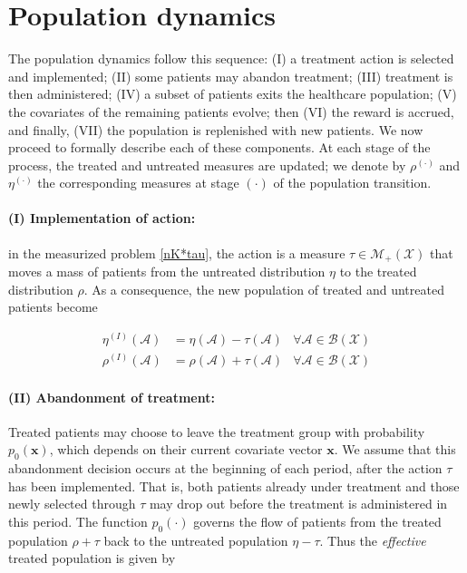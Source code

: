 \documentclass[12pt,a4paper]{article}
\newcommand{\blue}[1]{{\color{blue}{#1}}}
\newcommand{\bx}{\mathbf{x}}
\newcommand{\mA}{\mathcal{A}}
\newcommand{\mBX}{ \mathcal{B}(\mathcal{X})}
\newcommand{\mMplusX}{\mathcal{M}_{+}(\mathcal{X})}
\begin{document}
	
	
	
	
	\section{Population dynamics\label{Healthcare_process}}
    
The population dynamics follow this sequence: (I) a treatment action is selected and implemented; (II) some patients may abandon treatment; (III) treatment is then administered; (IV) a subset of patients exits the healthcare population; (V) the covariates of the remaining patients evolve; then (VI) the reward is accrued, and finally, (VII) the population is replenished with new patients. We now proceed to formally describe each of these components. At each stage of the process, the treated and untreated measures are updated; we denote by $\rho^{(\cdot)}$ and $\eta^{(\cdot)}$ the corresponding measures at stage $(\cdot)$ of the population transition.



\paragraph{\bf (I) Implementation of action:} in the measurized problem \eqref{nK*tau}, the action is a measure $\tau \in \mMplusX$ that moves a mass of patients from the untreated distribution $\eta$ to the treated distribution $\rho$. As a consequence, the new population of treated and untreated patients become

\begin{align*}
\eta^{(I)}(\mA)&=\eta(\mA) -\tau(\mA) & \forall \mA \in \mBX\\
\rho^{(I)}(\mA)&=  \rho(\mA)+\tau(\mA)& \forall \mA \in \mBX
\end{align*}



\paragraph{\bf (II) Abandonment of treatment:}
Treated patients may choose to leave the treatment group with probability $p_0(\bx)$, which depends on their current covariate vector $\bx$. We assume that this abandonment decision occurs at the beginning of each period, after the action $\tau$ has been implemented. That is, both patients already under treatment and those newly selected through $\tau$ may drop out before the treatment is administered in this period. The function $p_0(\cdot)$ governs the flow of patients from the treated population $\rho + \tau$ back to the untreated population $\eta - \tau$. 
Thus the {\it effective} treated population is given by
\end{document}
